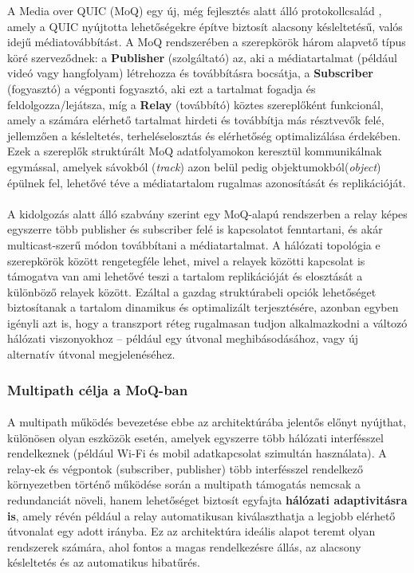 \documentclass[a4paper,oneside]{article}
\begin{document}
A Media over QUIC (MoQ) egy új, még fejlesztés alatt álló protokollcsalád \cite{moq_draft}, 
amely a QUIC nyújtotta lehetőségekre építve biztosít alacsony késleltetésű, 
valós idejű médiatovábbítást. A MoQ rendszerében a szerepkörök három alapvető 
típus köré szerveződnek: a \textbf{Publisher} (szolgáltató) az, aki a médiatartalmat (például 
videó vagy hangfolyam) létrehozza és továbbításra bocsátja, a \textbf{Subscriber} (fogyasztó)
a végponti fogyasztó, aki ezt a tartalmat fogadja és feldolgozza/lejátsza, míg a \textbf{Relay} (továbbító)
köztes szereplőként funkcionál, amely a számára elérhető tartalmat hirdeti és 
továbbítja más résztvevők felé, jellemzően a késleltetés, terheléselosztás 
és elérhetőség optimalizálása érdekében. 
Ezek a szereplők struktúrált MoQ adatfolyamokon keresztül kommunikálnak egymással, amelyek sávokból
(\emph{track}) azon belül pedig objektumokból(\emph{object}) épülnek 
fel, lehetővé téve a médiatartalom rugalmas azonosítását és replikációját.

\paragraph{}
A kidolgozás alatt álló szabvány szerint egy MoQ-alapú rendszerben a relay képes 
egyszerre több publisher és subscriber felé is kapcsolatot fenntartani, 
és akár multicast-szerű módon továbbítani a médiatartalmat. 
A hálózati topológia e szerepkörök között rengetegféle lehet, mivel 
a relayek közötti kapcsolat is támogatva van ami lehetővé teszi
a tartalom replikációját és elosztását a különböző relayek között. 
Ezáltal a gazdag struktúrabeli opciók lehetőséget biztosítanak a tartalom dinamikus 
és optimalizált terjesztésére, azonban egyben igényli azt is, hogy a transzport 
réteg rugalmasan tudjon alkalmazkodni a változó hálózati viszonyokhoz – például 
egy útvonal meghibásodásához, vagy új alternatív útvonal megjelenéséhez.

\subsubsection{Multipath célja a MoQ-ban}
\paragraph{}
A multipath működés bevezetése ebbe az architektúrába jelentős előnyt nyújthat, 
különösen olyan eszközök esetén, amelyek egyszerre több hálózati interfésszel 
rendelkeznek (például Wi-Fi és mobil adatkapcsolat szimultán használata). A relay-ek és végpontok 
(subscriber, publisher) több interfésszel rendelkező környezetben 
történő működése során a multipath támogatás nemcsak a redundanciát növeli, hanem 
lehetőséget biztosít egyfajta \textbf{hálózati adaptivitásra is}, amely révén például 
a relay automatikusan kiválaszthatja a legjobb elérhető útvonalat egy adott irányba. 
Ez az architektúra ideális alapot teremt olyan rendszerek számára, ahol fontos a magas 
rendelkezésre állás, az alacsony késleltetés és az automatikus hibatűrés.
\end{document}
